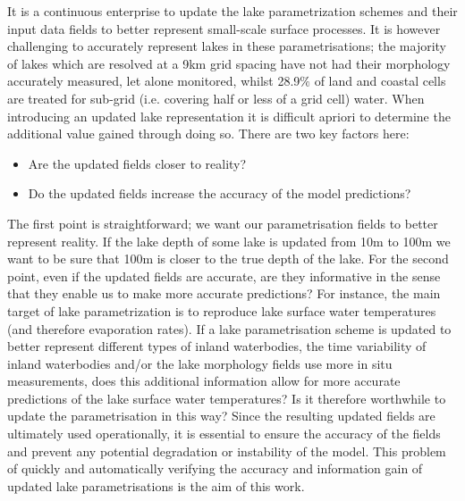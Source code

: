 \documentclass[hess, twostagejnl]{copernicus}
\begin{document}
\noindent It is a continuous enterprise to update the lake parametrization schemes and their input data fields to better represent small-scale surface processes. It is however challenging to accurately represent lakes in these parametrisations; the majority of lakes which are resolved at a 9km grid spacing have not had their morphology accurately measured, let alone monitored, whilst 28.9$\%$ of land and coastal cells are treated for sub-grid (i.e. covering half or less of a grid cell) water. When introducing an updated lake representation it is difficult apriori to determine the additional value gained through doing so. There are two key factors here:
\begin{itemize}
	\item Are the updated fields closer to reality?
	\item Do the updated fields increase the accuracy of the model predictions?
\end{itemize}
The first point is straightforward; we want our parametrisation fields to better represent reality. If the lake depth of some lake is updated from 10m to 100m we want to be sure that 100m is closer to the true depth of the lake. For the second point, even if the updated fields are accurate, are they informative in the sense that they enable us to make more accurate predictions? For instance, the main target of lake parametrization is to reproduce lake surface water temperatures (and therefore evaporation rates). If a lake parametrisation scheme is updated to better represent different types of inland waterbodies, the time variability of inland waterbodies and/or the lake morphology fields use more in situ measurements, does this additional information allow for more accurate predictions of the lake surface water temperatures? Is it therefore worthwhile to update the parametrisation in this way? Since the resulting updated fields are ultimately used operationally, it is essential to ensure the accuracy of the fields and prevent any potential degradation or instability of the model. This problem of quickly and automatically verifying the accuracy and information gain of updated lake parametrisations is the aim of this work. \newline
\end{document}
